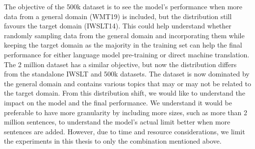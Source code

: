 The objective of the 500k dataset is to see the model's performance when more data from a general domain (WMT19) is included, but the distribution still favours the target domain (IWSLT14). This could help understand whether randomly sampling data from the general domain and incorporating them while keeping the target domain as the majority in the training set can help the final performance for either language model pre-training or direct machine translation. The 2 million dataset has a similar objective, but now the distribution differs from the standalone IWSLT and 500k datasets. The dataset is now dominated by the general domain and contains various topics that may or may not be related to the target domain. From this distribution shift, we would like to understand the impact on the model and the final performance.
We understand it would be preferable to have more granularity by including more sizes, such as more than 2 million sentences, to understand the model's actual limit better when more sentences are added. However, due to time and resource considerations, we limit the experiments in this thesis to only the combination mentioned above.

